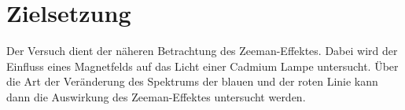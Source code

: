 \section{Zielsetzung}
\label{sec:Zielsetzung}

Der Versuch dient der näheren Betrachtung des Zeeman-Effektes. Dabei wird der Einfluss eines Magnetfelds auf das Licht einer Cadmium Lampe untersucht. Über die Art der Veränderung des Spektrums der blauen und der roten Linie kann dann die Auswirkung des Zeeman-Effektes untersucht werden. 
